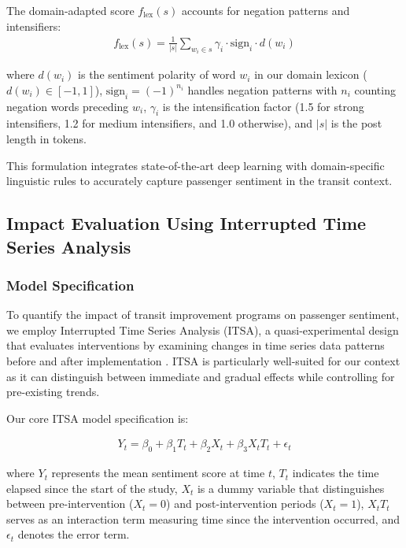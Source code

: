 \documentclass[a4paper,fleqn,12pt]{cas-sc}
\begin{document}
The domain-adapted score $f_{\text{lex}}(s)$ accounts for negation patterns and intensifiers:
\begin{align}
f_{\text{lex}}(s) = \frac{1}{|s|} \sum_{w_i \in s} \gamma_i \cdot \text{sign}_i \cdot d(w_i)
\end{align}

where $d(w_i)$ is the sentiment polarity of word $w_i$ in our domain lexicon ($d(w_i) \in [-1, 1]$), $\text{sign}_i = (-1)^{n_i}$ handles negation patterns with $n_i$ counting negation words preceding $w_i$, $\gamma_i$ is the intensification factor (1.5 for strong intensifiers, 1.2 for medium intensifiers, and 1.0 otherwise), and $|s|$ is the post length in tokens.

This formulation integrates state-of-the-art deep learning with domain-specific linguistic rules to accurately capture passenger sentiment in the transit context.

\subsection{Impact Evaluation Using Interrupted Time Series Analysis}

\subsubsection{Model Specification}

To quantify the impact of transit improvement programs on passenger sentiment, we employ Interrupted Time Series Analysis (ITSA), a quasi-experimental design that evaluates interventions by examining changes in time series data patterns before and after implementation \citep{bernal2017interrupted}. ITSA is particularly well-suited for our context as it can distinguish between immediate and gradual effects while controlling for pre-existing trends.

Our core ITSA model specification is:

\begin{align}
Y_t = \beta_0 + \beta_1 T_t + \beta_2 X_t + \beta_3 X_t T_t + \epsilon_t
\end{align}

where $Y_t$ represents the mean sentiment score at time $t$, $T_t$ indicates the time elapsed since the start of the study, $X_t$ is a dummy variable that distinguishes between pre-intervention ($X_t = 0$) and post-intervention periods ($X_t = 1$), $X_t T_t$ serves as an interaction term measuring time since the intervention occurred, and $\epsilon_t$ denotes the error term.
\end{document}

